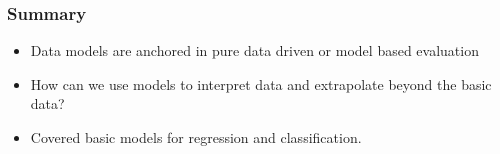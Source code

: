 \documentclass[10pt]{beamer}
\begin{document}
\begin{frame}
  \frametitle{Summary}
  \begin{itemize}
  \item Data models are anchored in pure data driven or model based evaluation
  \item How can we use models to interpret data and extrapolate beyond the basic data?
  \item Covered basic models for regression and classification. 
  \end{itemize}
\end{frame}



\end{document}
